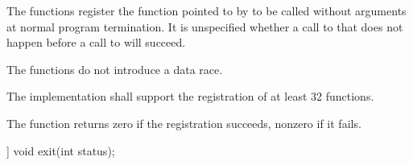 \begin{itemdescr}
\pnum
\effects
The
functions register the function pointed to by 
to be called without arguments at normal program termination.
It is unspecified whether a call to  that does not
happen before a call to  will succeed.
\begin{note} The  functions do not introduce a data
race. \end{note}

\pnum
\implimits
The implementation shall support the registration of at least 32 functions.

\pnum
\returns
The
function returns zero if the registration succeeds,
nonzero if it fails.
\end{itemdescr}

%
\begin{itemdecl}
[[noreturn]] void exit(int status);
\end{itemdecl}

